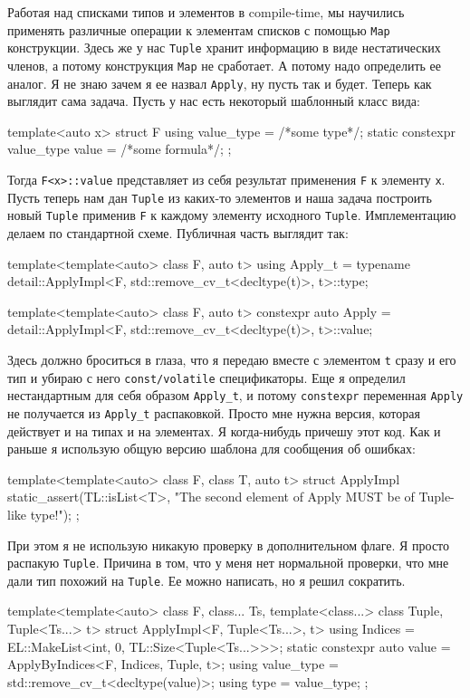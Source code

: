 Работая над списками типов и элементов в compile-time, мы научились применять различные операции к элементам списков с помощью \verb"Map" конструкции.
Здесь же у нас \verb"Tuple" хранит информацию в виде нестатических членов, а потому конструкция \verb"Map" не сработает.
А потому надо определить ее аналог.
Я не знаю зачем я ее назвал \verb"Apply", ну пусть так и будет.
Теперь как выглядит сама задача.
Пусть у нас есть некоторый шаблонный класс вида:
\begin{cppcode}
template<auto x>
struct F {
  using value_type = /*some type*/;
  static constexpr value_type value = /*some formula*/;
};
\end{cppcode}
Тогда \verb"F<x>::value" представляет из себя результат применения \verb"F" к элементу \verb"x".
Пусть теперь нам дан \verb"Tuple" из каких-то элементов и наша задача построить новый \verb"Tuple" применив \verb"F" к каждому элементу исходного \verb"Tuple".
Имплементацию делаем по стандартной схеме.
Публичная часть выглядит так:
\begin{cppcode}
template<template<auto> class F, auto t>
using Apply_t = typename detail::ApplyImpl<F, std::remove_cv_t<decltype(t)>, t>::type;

template<template<auto> class F, auto t>
constexpr auto Apply = detail::ApplyImpl<F, std::remove_cv_t<decltype(t)>, t>::value;
\end{cppcode}
Здесь должно броситься в глаза, что я передаю вместе с элементом \verb"t" сразу и его тип и убираю с него \verb"const/volatile" спецификаторы.
Еще я определил нестандартным для себя образом \verb"Apply_t", и потому \verb"constexpr" переменная \verb"Apply" не получается из \verb"Apply_t" распаковкой.
Просто мне нужна версия, которая действует и на типах и на элементах.
Я когда-нибудь причешу этот код.
Как и раньше я использую общую версию шаблона для сообщения об ошибках: 
\begin{cppcode}
template<template<auto> class F, class T, auto t>
struct ApplyImpl {
  static_assert(TL::isList<T>, "The second element of Apply MUST be of Tuple-like type!");
};
\end{cppcode}
При этом я не использую никакую проверку в дополнительном флаге.
Я просто распакую \verb"Tuple".
Причина в том, что у меня нет нормальной проверки, что мне дали тип похожий на \verb"Tuple".
Ее можно написать, но я решил сократить.
\begin{cppcode}
template<template<auto> class F, class... Ts, template<class...> class Tuple, Tuple<Ts...> t>
struct ApplyImpl<F, Tuple<Ts...>, t> {
  using Indices = EL::MakeList<int, 0, TL::Size<Tuple<Ts...>>>;
  static constexpr auto value = ApplyByIndices<F, Indices, Tuple, t>;
  using value_type = std::remove_cv_t<decltype(value)>;
  using type = value_type;
};
\end{cppcode}
